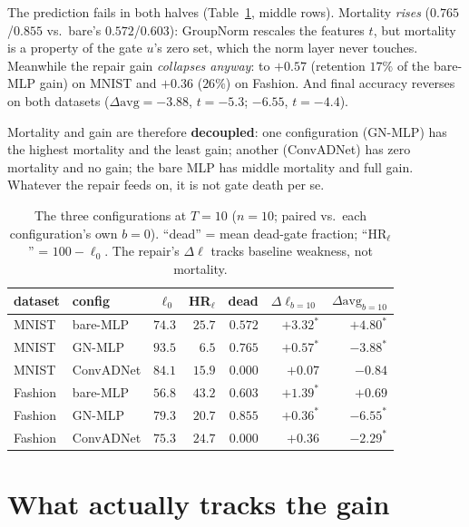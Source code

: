 \documentclass[review]{elsarticle}
\begin{document}
The prediction fails in both halves (Table~\ref{tab:three}, middle
rows). Mortality \emph{rises} ($0.765$/$0.855$ vs.\ bare's
$0.572$/$0.603$): GroupNorm rescales the features $t$, but mortality
is a property of the gate $u$'s zero set, which the norm layer never
touches. Meanwhile the repair gain \emph{collapses anyway}: to
$+0.57$ (retention $17\%$ of the bare-MLP gain) on MNIST and $+0.36$
($26\%$) on Fashion. And final accuracy reverses on both datasets
($\Delta\mathrm{avg} = -3.88$, $t{=}-5.3$; $-6.55$, $t{=}-4.4$).

Mortality and gain are therefore \textbf{decoupled}: one configuration
(GN-MLP) has the highest mortality and the least gain; another
(ConvADNet) has zero mortality and no gain; the bare MLP has middle
mortality and full gain. Whatever the repair feeds on, it is not gate
death per se.

\begin{table}[t]
\centering\small
\caption{The three configurations at $T{=}10$ ($n{=}10$; paired
vs.\ each configuration's own $b{=}0$). ``dead'' = mean dead-gate
fraction; ``HR$_\ell$'' = $100 - \ell_0$. The repair's
$\Delta\ell$ tracks baseline weakness, not mortality.}
\label{tab:three}
\begin{tabular}{llrrrrr}
\toprule
dataset & config & $\ell_0$ & HR$_\ell$ & dead &
$\Delta\ell_{b=10}$ & $\Delta\mathrm{avg}_{b=10}$ \\
\midrule
MNIST & bare-MLP & $74.3$ & $25.7$ & $0.572$ &
$+3.32^{*}$ & $+4.80^{*}$ \\
MNIST & GN-MLP & $93.5$ & $6.5$ & $\mathbf{0.765}$ &
$+0.57^{*}$ & $-3.88^{*}$ \\
MNIST & ConvADNet & $84.1$ & $15.9$ & $\mathbf{0.000}$ &
$+0.07$ & $-0.84$ \\
\midrule
Fashion & bare-MLP & $56.8$ & $43.2$ & $0.603$ &
$+1.39^{*}$ & $+0.69$ \\
Fashion & GN-MLP & $79.3$ & $20.7$ & $\mathbf{0.855}$ &
$+0.36^{*}$ & $-6.55^{*}$ \\
Fashion & ConvADNet & $75.3$ & $24.7$ & $\mathbf{0.000}$ &
$+0.36$ & $-2.29^{*}$ \\
\bottomrule
\end{tabular}
\end{table}

\section{What actually tracks the gain}
\label{sec:whattracks}
\end{document}

